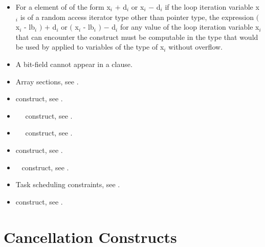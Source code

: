 {{{{\begin{itemize}
\cppspecificstart
\item For a  element of   of the form
x$_{i}$ $+$ d$_{i}$ or x$_{i}$ $-$ d$_{i}$ if the loop iteration variable
x$_{i}$ is of a random access iterator type other than pointer type,
the expression $($ x$_{i}$ - lb$_{i}$ $)$ $+$ d$_{i}$ or
$($ x$_{i}$ - lb$_{i}$ $)$ $-$ d$_{i}$ for any value of the loop iteration variable
x$_{i}$ that can encounter the  construct must be computable in the
type that would be used by  applied to variables of the
type of x$_{i}$ without overflow.
\cppspecificend

\ccppspecificstart
\item A bit-field cannot appear in a  clause.
\ccppspecificend

\end{itemize}

\crossreferences
\begin{itemize}
\item Array sections, see
.

\item {} construct, see 
.

\item {}~~ construct, see 
.

\item {}~~ construct, see 
.

\item {} construct, see 
.

\item {}~ construct, see 
.

\item Task scheduling constraints, see
. 

\item {} construct, see
. 
\end{itemize}







\section{Cancellation Constructs}
\label{sec:Cancellation Constructs}
}}}}
